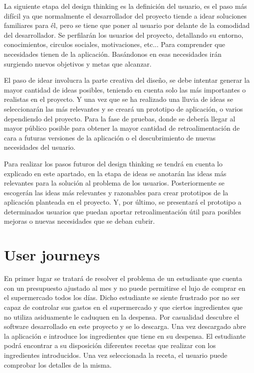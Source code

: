 La siguiente etapa del \gls{design thinking} es la definición del usuario, es el paso más difícil ya que normalmente el desarrollador del proyecto tiende a idear soluciones familiares para él, pero se tiene que poner al usuario por delante de la comodidad del desarrollador. Se perfilarán los usuarios del proyecto, detallando su entorno, conocimientos, circulos sociales, motivaciones, etc... Para comprender que necesidades tienen de la aplicación. Basándonos en esas necesidades irán surgiendo nuevos objetivos y metas que alcanzar.

El paso de idear involucra la parte creativa del diseño, se debe intentar generar la mayor cantidad de ideas posibles, teniendo en cuenta solo las más importantes o realistas en el proyecto. Y una vez que se ha realizado una lluvia de ideas se seleccionarán las más relevantes y se creará un prototipo de aplicación, o varios dependiendo del proyecto. Para la fase de pruebas, donde se debería llegar al mayor público posible para obtener la mayor cantidad de retroalimentación de cara a futuras versiones de la aplicación o el descubrimiento de nuevas necesidades del usuario. \cite{wolniak2017design}

Para realizar los pasos futuros del \gls{design thinking} se tendrá en cuenta lo explicado en este apartado, en la etapa de ideas se anotarán las ideas más relevantes para la solución al problema de los usuarios. Posteriormente se escogerán las ideas más relevantes y razonables para crear prototipos de la aplicación planteada en el proyecto. Y, por último, se presentará el prototipo a determinados usuarios que puedan aportar retroalimentación útil para posibles mejoras o nuevas necesidades que se deban cubrir.

\section{User journeys}

En primer lugar se tratará de resolver el problema de un estudiante que cuenta con un presupuesto ajustado al mes y no puede permitirse el lujo de comprar en el supermercado todos los días. Dicho estudiante se siente frustrado por no ser capaz de controlar sus gastos en el supermercado y que ciertos ingredientes que no utiliza asiduamente le caduquen en la despensa. Por casualidad descubre el software desarrollado en este proyecto y se lo descarga. Una vez descargado abre la aplicación e introduce los ingredientes que tiene en su despensa. El estudiante podrá encontrar a su disposición diferentes recetas que realizar con los ingredientes introducidos. Una vez seleccionada la receta, el usuario puede comprobar los detalles de la misma.

